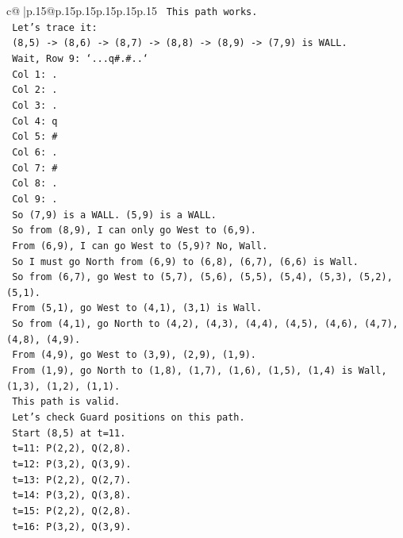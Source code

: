 \documentclass{article}
\begin{document}
{\begin{supertabular}{c@{$\;$}|p{.15\linewidth}@{}p{.15\linewidth}p{.15\linewidth}p{.15\linewidth}p{.15\linewidth}p{.15\linewidth}}
{{{\texttt{  This path works.} \\
\texttt{  Let's trace it:} \\
\texttt{  (8,5) {-}> (8,6) {-}> (8,7) {-}> (8,8) {-}> (8,9) {-}> (7,9) is WALL.} \\
\texttt{  Wait, Row 9: `...q\#.\#..`} \\
\texttt{  Col 1: .} \\
\texttt{  Col 2: .} \\
\texttt{  Col 3: .} \\
\texttt{  Col 4: q} \\
\texttt{  Col 5: \#} \\
\texttt{  Col 6: .} \\
\texttt{  Col 7: \#} \\
\texttt{  Col 8: .} \\
\texttt{  Col 9: .} \\
\texttt{  So (7,9) is a WALL. (5,9) is a WALL.} \\
\texttt{  So from (8,9), I can only go West to (6,9).} \\
\texttt{  From (6,9), I can go West to (5,9)? No, Wall.} \\
\texttt{  So I must go North from (6,9) to (6,8), (6,7), (6,6) is Wall.} \\
\texttt{  So from (6,7), go West to (5,7), (5,6), (5,5), (5,4), (5,3), (5,2), (5,1).} \\
\texttt{  From (5,1), go West to (4,1), (3,1) is Wall.} \\
\texttt{  So from (4,1), go North to (4,2), (4,3), (4,4), (4,5), (4,6), (4,7), (4,8), (4,9).} \\
\texttt{  From (4,9), go West to (3,9), (2,9), (1,9).} \\
\texttt{  From (1,9), go North to (1,8), (1,7), (1,6), (1,5), (1,4) is Wall, (1,3), (1,2), (1,1).} \\
\texttt{  This path is valid.} \\
\texttt{  Let's check Guard positions on this path.} \\
\texttt{  Start (8,5) at t=11.} \\
\texttt{  t=11: P(2,2), Q(2,8).} \\
\texttt{  t=12: P(3,2), Q(3,9).} \\
\texttt{  t=13: P(2,2), Q(2,7).} \\
\texttt{  t=14: P(3,2), Q(3,8).} \\
\texttt{  t=15: P(2,2), Q(2,8).} \\
\texttt{  t=16: P(3,2), Q(3,9).} \\
}}}
\end{supertabular}}
\end{document}
